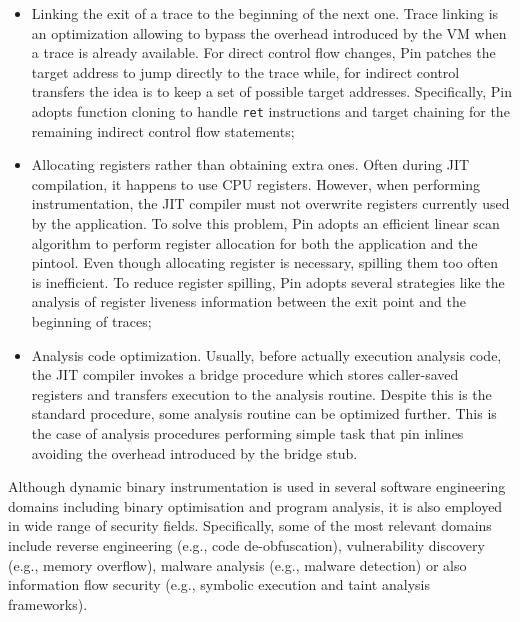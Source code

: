 \documentclass[LaM,binding=0.6cm]{sapthesis}
\begin{document}
\begin{itemize}
\item Linking the exit of a trace to the beginning of the next one. Trace linking is an optimization allowing to bypass the overhead introduced by the VM when a trace is already available. For direct control flow changes, Pin patches the target address to jump directly to the trace while, for indirect control transfers the idea is to keep a set of possible target addresses. Specifically, Pin adopts function cloning to handle \texttt{ret} instructions and target chaining for the remaining indirect control flow statements;
\item Allocating registers rather than obtaining extra ones. Often during JIT compilation, it happens to use CPU registers. However, when performing instrumentation, the JIT compiler must not overwrite registers currently used by the application. To solve this problem, Pin adopts an efficient linear scan algorithm to perform register allocation\cite{poletto1999linear} for both the application and the pintool. Even though allocating register is necessary, spilling them too often is inefficient. To reduce register spilling, Pin adopts several strategies like the analysis of register liveness information between the exit point and the beginning of traces;
\item Analysis code optimization. Usually, before actually execution analysis code, the JIT compiler invokes a bridge procedure which stores caller-saved registers and transfers execution to the analysis routine. Despite this is the standard procedure, some analysis routine can be optimized further. This is the case of analysis procedures performing simple task that pin inlines avoiding the overhead introduced by the bridge stub.
\end{itemize}
Although dynamic binary instrumentation is used in several software engineering domains including binary optimisation and program analysis, it is also employed in wide range of security fields. Specifically, some of the most relevant domains include reverse engineering (e.g., code de-obfuscation), vulnerability discovery (e.g., memory overflow), malware analysis (e.g., malware detection) or also information flow security (e.g., symbolic execution and taint analysis frameworks).
\end{document}
